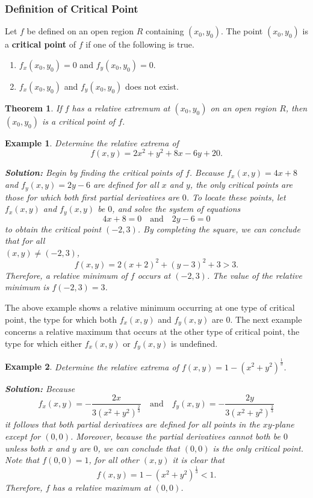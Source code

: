 \documentclass[titlepage,a4paper,12pt]{report}
\newtheorem{example}{Example}[section]
\newtheorem{theorem}{Theorem}[section]
\begin{document}
\subsubsection{Definition of Critical Point}
Let $f$ be defined on an open region $R$ containing $(x_0,y_0)$. The point $(x_0,y_0)$ is a \textbf{critical point} of $f$ if one of the following is true.
\begin{enumerate}
\item $f_x(x_0,y_0)=0$ and $f_y(x_0,y_0)=0$.
\item $f_x(x_0,y_0)$ and $f_y(x_0,y_0)$ does not exist.
\end{enumerate}
\begin{theorem}
If $f$ has a relative extremum at $(x_0,y_0)$ on an open region $R$, then $(x_0,y_0)$ is a critical point of $f$.
\end{theorem}
\begin{example}
Determine the relative extrema of 
\[f(x,y)=2x^2+y^2+8x-6y+20.\]

\noindent \textbf{Solution:} Begin by finding the critical points of $f$. Because $f_x(x,y)=4x+8$ and $f_y(x,y)=2y-6$ are defined for all $x$ and $y$, the only critical points are those for which both first partial derivatives are $0$. To locate these points, let $f_x(x,y)$ and $f_y(x,y)$ be $0$, and solve the system of equations 
\[4x+8=0 \quad \mbox{and} \quad 2y-6=0\] to obtain the critical point $(-2,3)$. By completing the square, we can conclude that for all\\ $(x,y) \neq (-2,3)$, 
\[f(x,y)=2(x+2)^2+(y-3)^2+3>3.\]
Therefore, a relative \textit{minimum} of $f$ occurs at $(-2,3)$. The value of the relative minimum is $f(-2,3)=3$.
\end{example}
The above example shows a relative minimum occurring at one type of critical point, the type for which  both $f_x(x,y)$ and $f_y(x,y)$ are $0$. The next example concerns a relative maximum that occurs at the other type of critical point, the type for which either $f_x(x,y)$ or $f_y(x,y)$ is undefined.
\begin{example}
Determine the relative extrema of $f(x,y)=1-(x^2+y^2)^{\frac{1}{3}}$.

\noindent \textbf{Solution:} Because 
\[f_x(x,y)=-\dfrac{2x}{3(x^2+y^2)^{\frac{2}{3}}} \quad \mbox{and} \quad f_y(x,y)=-\dfrac{2y}{3(x^2+y^2)^{\frac{2}{3}}}\] it follows that both partial derivatives are defined for all points in the $xy$-plane except for $(0,0)$. Moreover, because the partial derivatives cannot both be $0$ unless both $x$ and $y$ are $0$, we can conclude that $(0,0)$ is the only critical point. Note that $f(0,0)=1$, for all other $(x,y)$ it is clear that 
\[f(x,y)=1-(x^2+y^2)^{\frac{1}{3}} <1.\] Therefore, $f$ has a relative maximum at $(0,0)$.
\end{example}
\end{document}
